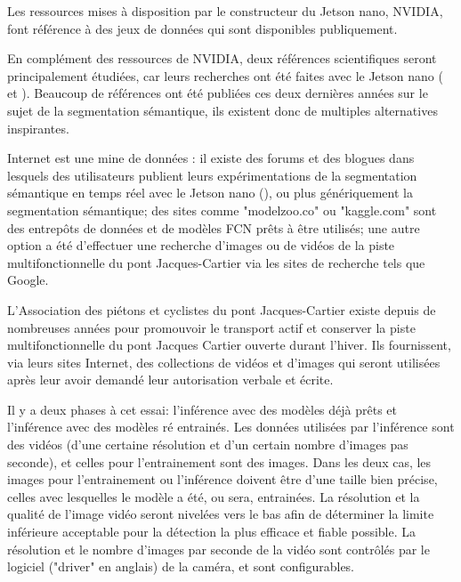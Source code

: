 ﻿\label{metho:data}
\par Les ressources mises à disposition par le constructeur du Jetson nano, NVIDIA, font référence à des jeux de données qui sont disponibles publiquement.
\par En complément des ressources de NVIDIA, deux références scientifiques seront principalement étudiées, car leurs recherches ont été faites avec le Jetson nano (\cite{nguyen_mavnet_2019} et \cite{chong_real-time_1992}). Beaucoup de références ont été publiées ces deux dernières années sur le sujet de la segmentation sémantique, ils existent donc de multiples alternatives inspirantes.
\par Internet est une mine de données : il existe des forums et des blogues dans lesquels des utilisateurs publient leurs expérimentations de la segmentation sémantique en temps réel avec le Jetson nano (\cite{dustin_realtime_2019}), ou plus génériquement la segmentation sémantique; des sites comme "modelzoo.co" ou "kaggle.com" sont des entrepôts de données et de modèles FCN prêts à être utilisés; une autre option a été d'effectuer une recherche d'images ou de vidéos de la piste multifonctionnelle du pont Jacques-Cartier via les sites de recherche tels que Google. 
\par L'Association des piétons et cyclistes du pont Jacques-Cartier existe depuis de nombreuses années pour promouvoir le transport actif et conserver la piste multifonctionnelle du pont Jacques Cartier ouverte durant l'hiver. Ils fournissent, via leurs sites Internet, des collections de vidéos et d'images qui seront utilisées après leur avoir demandé leur autorisation verbale et écrite. \cite{association_des_pietons_et_cyclistes_du_pont_jacques-cartier_pontjacques-cartier365com_2020} \cite{association_des_pietons_et_cyclistes_pont_jacques-cartier_flickr_2020}
\par Il y a deux phases à cet essai: l'inférence avec des modèles déjà prêts et l'inférence avec des modèles ré entrainés. Les données utilisées par l'inférence sont des vidéos (d'une certaine résolution et d'un certain nombre d'images pas seconde), et celles pour l'entrainement sont des images. Dans les deux cas, les images pour l'entrainement ou l'inférence doivent être d'une taille bien précise, celles avec lesquelles le modèle a été, ou sera, entrainées. La résolution et la qualité de l'image vidéo seront nivelées vers le bas afin de déterminer la limite inférieure acceptable pour la détection la plus efficace et fiable possible. La résolution et le nombre d'images par seconde de la vidéo sont contrôlés par le logiciel ("driver" en anglais) de la caméra, et sont configurables. 
